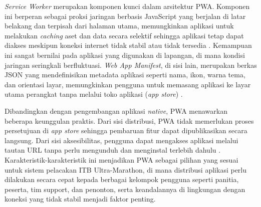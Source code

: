 \textit{Service Worker} merupakan komponen kunci dalam arsitektur PWA. Komponen ini berperan sebagai proksi jaringan berbasis JavaScript yang berjalan di latar belakang dan terpisah dari halaman utama, memungkinkan aplikasi untuk melakukan \textit{caching} aset dan data secara selektif sehingga aplikasi tetap dapat diakses meskipun koneksi internet tidak stabil atau tidak tersedia \cite{malavolta2017assessing}. Kemampuan ini sangat bernilai pada aplikasi yang digunakan di lapangan, di mana kondisi jaringan seringkali berfluktuasi. \textit{Web App Manifest}, di sisi lain, merupakan berkas JSON yang mendefinisikan metadata aplikasi seperti nama, ikon, warna tema, dan orientasi layar, memungkinkan pengguna untuk memasang aplikasi ke layar utama perangkat tanpa melalui toko aplikasi (\textit{app store}) \cite{tandel2018impact}.

Dibandingkan dengan pengembangan aplikasi \textit{native}, PWA menawarkan beberapa keunggulan praktis. Dari sisi distribusi, PWA tidak memerlukan proses persetujuan di \textit{app store} sehingga pembaruan fitur dapat dipublikasikan secara langsung. Dari sisi aksesibilitas, pengguna dapat mengakses aplikasi melalui tautan URL tanpa perlu mengunduh dan menginstal terlebih dahulu \cite{biorn2017progressive}. Karakteristik-karakteristik ini menjadikan PWA sebagai pilihan yang sesuai untuk sistem pelacakan ITB Ultra-Marathon, di mana distribusi aplikasi perlu dilakukan secara cepat kepada berbagai kelompok pengguna seperti panitia, peserta, tim support, dan penonton, serta keandalannya di lingkungan dengan koneksi yang tidak stabil menjadi faktor penting.
 

